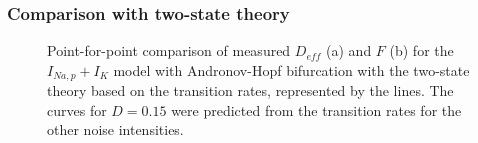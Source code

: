 \documentclass[12pt,a4paper]{article}
\begin{document}
\subsubsection{Comparison with two-state theory}
 
\begin{figure}[H]
	\hspace*{-0.5cm}
	\caption{Point-for-point comparison of measured $D_{eff}$ (a) and $F$ (b) for the $I_{Na,p}+I_K$ model with Andronov-Hopf bifurcation with the two-state theory based on the transition rates, represented by the lines. The curves for $D=0.15$ were predicted from the transition rates for the other noise intensities.}
\end{figure}
\end{document}
